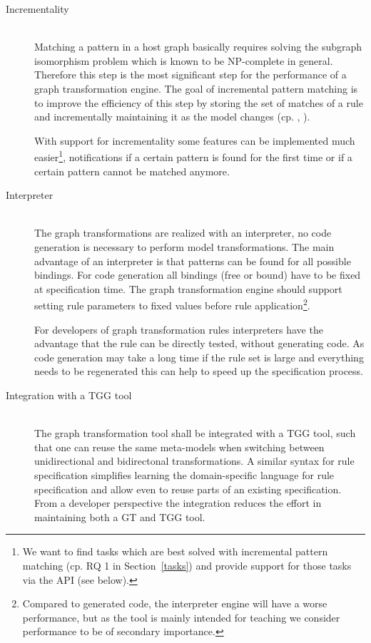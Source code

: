 \begin{description}
	\item[Incrementality] ~\\
		Matching a pattern in a host graph basically requires solving the subgraph isomorphism problem which is known to be NP-complete in general.
		Therefore this step is the most significant step for the performance of a graph transformation engine.
		The goal of incremental pattern matching is to improve the efficiency of this step by storing the set of matches of a rule and incrementally maintaining it as the model changes
		(cp. \cite{IncrementalGraphPatternMatching}, \cite{EvaluationOfIncrementalPatternMatching}).

		With support for incrementality some features can be implemented much easier\footnote{We want to find tasks which are best solved with incremental pattern matching (cp. RQ 1 in Section~\ref{tasks}) and provide support for those tasks via the API (see below).},
		\eg notifications if a certain pattern is found for the first time
		or if a certain pattern cannot be matched anymore.

	\item[Interpreter] ~\\
		The graph transformations are realized with an interpreter, no code generation is necessary to perform model transformations.
		The main advantage of an interpreter is that patterns can be found for all possible bindings.
		For code generation all bindings (free or bound) have to be fixed at specification time.
		The graph transformation engine should support setting rule parameters to fixed values before rule application\footnote{Compared to generated code, the interpreter engine will have a worse performance, but as the tool is mainly intended for teaching we consider performance to be of secondary importance.}.
		
		For developers of graph transformation rules interpreters have the advantage that the rule can be directly tested, without generating code.
		As code generation may take a long time if the rule set is large and everything needs to be regenerated this can help to speed up the specification process.

	\item[Integration with a TGG tool] ~\\
		The graph transformation tool shall be integrated with a TGG tool,
		such that one can reuse the same meta-models when switching between unidirectional and bidirectonal transformations.
		A similar syntax for rule specification simplifies learning the domain-specific language for rule specification and allow even to reuse parts of an existing specification.
		From a developer perspective the integration reduces the effort in maintaining both a GT and TGG tool.


\end{description}
